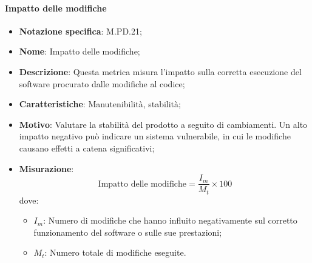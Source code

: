 \paragraph*{Impatto delle modifiche}
\begin{itemize}
    \item \textbf{Notazione specifica}: M.PD.21;
    \item \textbf{Nome}: Impatto delle modifiche;
    \item \textbf{Descrizione}: Questa metrica misura l'impatto sulla corretta esecuzione del software procurato dalle modifiche al codice;
    \item \textbf{Caratteristiche}: Manutenibilità, stabilità;
    \item \textbf{Motivo}: Valutare la stabilità del prodotto a seguito di cambiamenti. Un alto impatto negativo può indicare un sistema vulnerabile, in cui le modifiche causano effetti a catena significativi;
    \item \textbf{Misurazione}: 
    \[
    \text{Impatto delle modifiche} = \frac{I_{m}}{M_{t}} \times 100
    \]
    dove:
    \begin{itemize}
        \item $I_{m}$: Numero di modifiche che hanno influito negativamente sul corretto funzionamento del software o sulle sue prestazioni;
        \item $M_{t}$: Numero totale di modifiche eseguite.
    \end{itemize}
\end{itemize}

